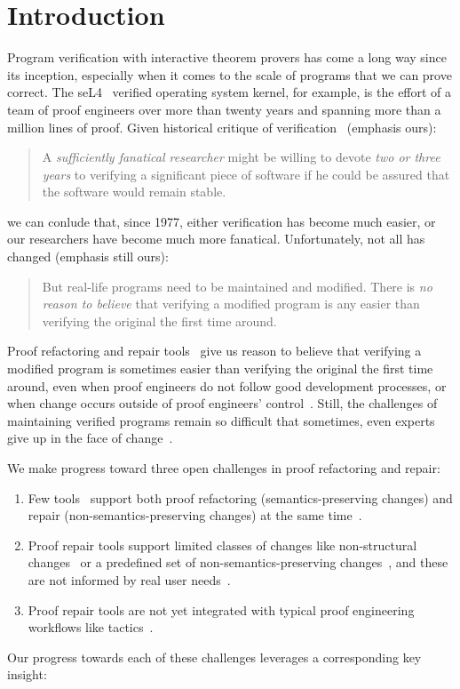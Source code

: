 \section{Introduction}

Program verification with interactive theorem provers has come a long way since its inception,
especially when it comes to the scale of programs that we can prove correct.
The seL4~\cite{Klein2009} verified operating system kernel, for example,
is the effort of a team of proof engineers over more than twenty years and spanning more than
a million lines of proof.
Given historical critique of verification~\cite{DeMillo1977} (emphasis ours):

\begin{quote}
A \textit{sufficiently fanatical researcher}
might be willing to devote \textit{two or 
three years} to verifying a significant 
piece of software if he could be 
assured that the software would remain stable.
\end{quote}
we can conlude that, since 1977, either verification has become much easier,
or our researchers have become much more fanatical. Unfortunately, not all has changed (emphasis still ours):

\begin{quote}
But real-life programs need to 
be maintained and modified. 
There is \textit{no reason to believe} that verifying a modified program is any 
easier than verifying the original the 
first time around.
\end{quote}
Proof refactoring and repair tools~\cite{wibergh2019, WhitesidePhD, Dietrich2013,
adams2015, Bourke12, Roe2016, robert2018, pumpkinpatch} give us reason to believe
that verifying a modified program is sometimes easier than verifying the original the first time
around, even when proof engineers do not follow good development processes,
or when change occurs outside of proof engineers' control~\cite{PGL-045}.
Still, the challenges of maintaining verified programs remain so difficult that
sometimes, even experts give up in the face of change~\cite{replica}.

We make progress toward three open challenges in proof refactoring and repair:

\begin{enumerate}
\item Few tools~\cite{robert2018, wibergh2019} support both proof refactoring (semantics-preserving changes) and repair (non-semantics-preserving changes) at the same time~\cite{PGL-045}.
\item Proof repair tools support limited classes of changes like non-structural changes~\cite{pumpkinpatch} or a predefined set
of non-semantics-preserving changes~\cite{robert2018, wibergh2019}, and these are not informed by real user needs~\cite{replica}.
\item Proof repair tools are not yet integrated with typical proof engineering workflows like tactics~\cite{PGL-045, pumpkinpatch, robert2018}.
\end{enumerate}
Our progress towards each of these challenges leverages a corresponding key insight: %

